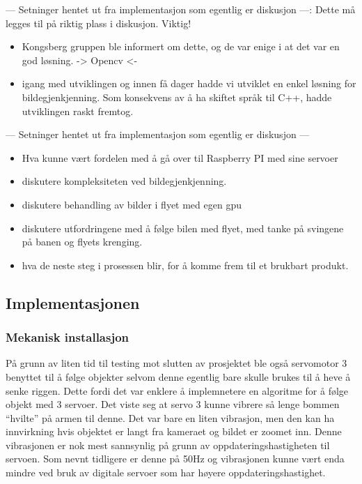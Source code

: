 --- Setninger hentet ut fra implementasjon som egentlig er diskusjon ---: Dette må legges til på riktig plass i diskusjon. Viktig!
\begin{itemize}
\item Kongsberg gruppen ble informert om dette, og de var enige i at det var en god løsning. -> Opencv <-
\item igang med utviklingen og innen få dager hadde vi utviklet en enkel løsning for bildegjenkjenning.
\tem Som konsekvens av å ha skiftet språk til C++, hadde utviklingen raskt fremtog. 

\end {itemize}
--- Setninger hentet ut fra implementasjon som egentlig er diskusjon ---

\begin{itemize}
\item 
Hva kunne vært fordelen med å gå over til Raspberry PI med sine servoer

\item diskutere kompleksiteten ved bildegjenkjenning. 

\item diskutere behandling av bilder i flyet med egen gpu

\item diskutere utfordringene med å følge bilen med flyet, med tanke på svingene på banen og flyets krenging.

\item hva de neste steg i prosessen blir, for å komme frem til et brukbart produkt. 
\end{itemize}

\subsection{Implementasjonen}
 
\subsubsection{Mekanisk installasjon}


På grunn av liten tid til testing mot slutten av prosjektet ble også servomotor 3 benyttet til å følge objekter selvom denne egentlig bare skulle brukes til å heve å senke riggen. Dette fordi det var enklere å implemnetere en algoritme for å følge objekt med 3 servoer. Det viste seg at servo 3 kunne vibrere så lenge bommen ``hvilte'' på armen til denne. Det var bare en liten vibrasjon, men den kan ha innvirkning hvis objektet er langt fra kameraet og bildet er zoomet inn. Denne vibrasjonen er nok mest sannsynlig på grunn av oppdateringshastigheten til servoen. Som nevnt tidligere er denne på 50Hz og vibrasjonen kunne vært enda mindre ved bruk av digitale servoer som har høyere oppdateringshastighet.  

